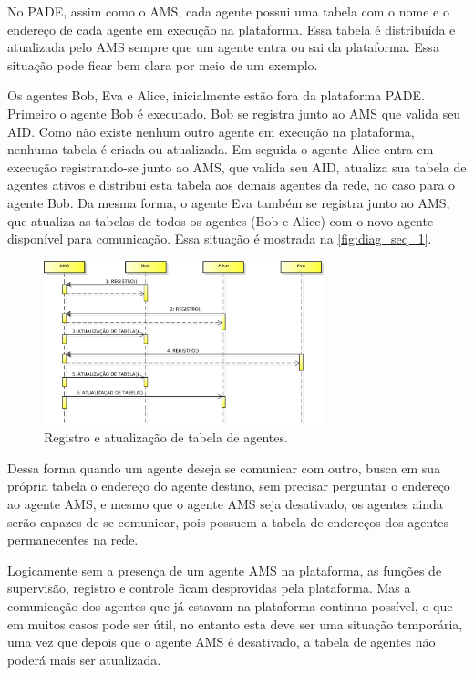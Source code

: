 \documentclass[journal]{IEEEtran}
\begin{document}
No PADE, assim como o AMS, cada agente possui uma tabela com o nome e o endereço de cada agente em execução na plataforma. Essa tabela é distribuída e atualizada pelo AMS sempre que um agente entra ou sai da plataforma. Essa situação pode ficar bem clara por meio de um exemplo.

Os agentes Bob, Eva e Alice, inicialmente estão fora da plataforma PADE. Primeiro o agente Bob é executado. Bob se registra junto ao AMS que valida seu AID. Como não existe nenhum outro agente em execução na plataforma, nenhuma tabela é criada ou atualizada. Em seguida o agente Alice entra em execução registrando-se junto ao AMS, que valida seu AID, atualiza sua tabela de agentes ativos e distribui esta tabela aos demais agentes da rede, no caso para o agente Bob. Da mesma forma, o agente Eva também se registra junto ao AMS, que atualiza as tabelas de todos os agentes (Bob e Alice) com o novo agente disponível para comunicação. Essa situação é mostrada na \autoref{fig:diag_seq_1}.

\begin{figure}[!htb]
    \centering
    \includegraphics[width=3.2in]{Figuras/alice_bob_eva.eps}
    \caption{\label{fig:diag_seq_1}Registro e atualização de tabela de agentes.}
\end{figure}

Dessa forma quando um agente deseja se comunicar com outro, busca em sua própria tabela o endereço do agente destino, sem precisar perguntar o endereço ao agente AMS, e mesmo que o agente AMS seja desativado, os agentes ainda serão capazes de se comunicar, pois possuem a tabela de endereços dos agentes permanecentes na rede.

Logicamente sem a presença de um agente AMS na plataforma, as funções de supervisão, registro e controle ficam desprovidas pela plataforma. Mas a comunicação dos agentes que já estavam na plataforma continua possível, o que em muitos casos pode ser útil, no entanto esta deve ser uma situação temporária, uma vez que depois que o agente AMS é desativado, a tabela de agentes não poderá mais ser atualizada.
\end{document}
